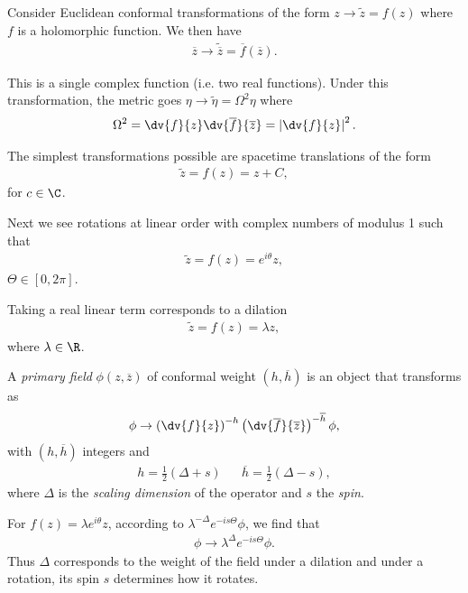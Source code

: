 Consider Euclidean conformal transformations of the form $z \to \widetilde{z} = f\left( z \right) $ where $f$ is a holomorphic function. We then have
\begin{align}
    \overline{z} \to \widetilde{\overline{z}} = \overline{f}\left( \overline{z} \right) 
.\end{align}

This is a single complex function (i.e. two real functions). Under this transformation, the metric goes $\eta \to \widetilde{\eta} = \Omega^2 \eta$ where
\begin{align}
    \Omega^2 = \dv{f}{z} \dv{\overline{f}}{\overline{z}} = \left| \dv{f}{z} \right|^2
.\end{align}

The simplest transformations possible are spacetime translations of the form
\begin{align}
    \widetilde{z} = f\left( z \right) = z + C
,\end{align}
for $c \in \C$. 

Next we see rotations at linear order with complex numbers of modulus 1 such that
\begin{align}
    \widetilde{z} = f\left( z \right)  = e^{i \theta}z
,\end{align}
$\Theta \in \left[ 0,2\pi \right] $.

Taking a real linear term corresponds to a dilation
\begin{align}
    \widetilde{z} = f\left( z \right) = \lambda z
,\end{align}
where $\lambda \in \R$.

\begin{definition}
    A \emph{primary field} $\phi \left( z, \overline{z} \right) $ of conformal weight $\left( h,\overline{h} \right) $ is an object that transforms as
    \begin{align}
        \phi \to \left( \dv{f}{z} \right)^{-h} \left( \dv{\overline{f}}{\overline{z}} \right)^{-\overline{h}} \phi
    ,\end{align}
    with $\left( h,\overline{h} \right) $ integers and
    \begin{align}
        h = \frac{1}{2} \left( \Delta + s \right)  && \overline{h} = \frac{1}{2} \left( \Delta - s \right) 
    ,\end{align}
    where $\Delta$ is the \emph{scaling dimension} of the operator and $s$ the \emph{spin}.
\end{definition}

For $f\left( z \right) = \lambda e^{i \theta} z$, according to $\lambda^{-\Delta} e^{-is \Theta} \phi$, we find that
\begin{align}
    \phi \to \lambda^{\Delta} e^{-i s \Theta} \phi
.\end{align}
Thus $\Delta$ corresponds to the weight of the field under a dilation and under a rotation, its spin $s$ determines how it rotates.

